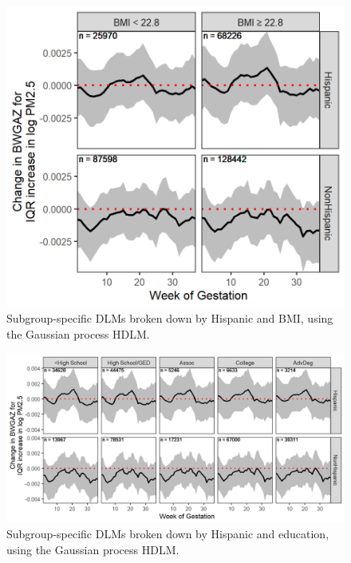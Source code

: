 \documentclass[12pt]{article}
\begin{document}
\begin{figure}[!ht]
	\centering
    \includegraphics[width=.5\textwidth]{supp-img/gp_hisp_bmi.png}
    \caption{Subgroup-specific DLMs broken down by Hispanic and BMI, using the Gaussian process HDLM.}
    \label{fig:gp-hisp-bmi}
\end{figure}
\begin{figure}[!ht]
	\centering
    \includegraphics[width=.9\textwidth]{supp-img/gp_hisp_educ.png}
    \caption{Subgroup-specific DLMs broken down by Hispanic and education, using the Gaussian process HDLM.}
    \label{fig:gp-hisp-educ}
\end{figure}
\clearpage

\end{document}
